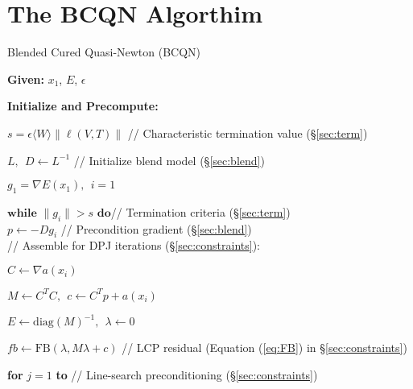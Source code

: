 \section{The BCQN Algorthim}
\label{sec:alg}

\begin{algorithm}[h!]
\label{alg:BCQN}
\caption{Blended Cured Quasi-Newton (BCQN)}

\textbf{Given:} $x_1$, $E$, $\epsilon$  \hspace{10pt} 

\textbf{Initialize and Precompute:}

\hspace{30pt} $s = \epsilon \langle W \rangle \| \ell(V,T) \| $  \hspace{10pt} // Characteristic termination value (\S\ref{sec:term})

\hspace{30pt} $L, \> \> D \leftarrow L^{-1}$ \hspace{10pt} // Initialize blend model  (\S\ref{sec:blend})

\hspace{30pt} $g_1 = \nabla E(x_1), \> \> i = 1$ 
 
$\textbf{while}$ $ \|g_i\| > s$ $\textbf{do}$\hspace{10pt}// Termination criteria  (\S\ref{sec:term})\\

\hspace{10pt} $p \leftarrow -D g_i$ \hspace{10pt}//  Precondition gradient (\S\ref{sec:blend})\\

\hspace{10pt} // Assemble for DPJ iterations (\S\ref{sec:constraints}):

\hspace{20pt} $C \leftarrow \nabla a(x_i)$ 

\hspace{20pt} $M \leftarrow C^T C, \> \> c \leftarrow C^T  p + a(x_i)$

\hspace{20pt} $E \leftarrow \mathrm{diag}(M)^{-1}, \> \> \lambda \leftarrow 0$ 

\hspace{10pt} $\mathit{fb} \leftarrow \textrm{FB}(\lambda, M \lambda  +  c)$ \hspace{10pt}// LCP residual (Equation (\ref{eq:FB}) in \S\ref{sec:constraints})

\hspace{10pt} \textbf{for} $j = 1$ \textbf{to}  \hspace{10pt}// Line-search preconditioning  (\S\ref{sec:constraints})


\end{algorithm}
